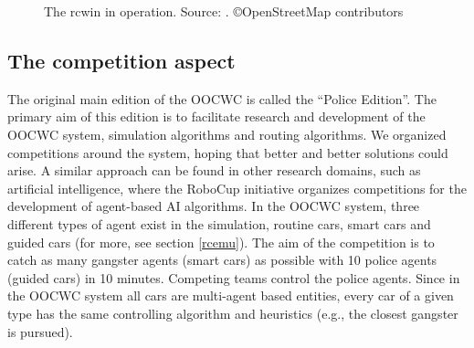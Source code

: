 \documentclass[b5paper,12pt]{report}
\theoremstyle{definition}
\begin{document}
\begin{figure}[!ht]
\begin{center}
\end{center}
\caption{The rcwin in operation. Source: \cite{infocomjournal}. \copyright OpenStreetMap contributors}
\label{rcwin_example}
\end{figure} 

\subsection{The competition aspect}
\label{competition}

The original main edition of the OOCWC is called the \enquote{Police Edition}. The primary aim of this edition is to facilitate research and development of the OOCWC system, simulation algorithms and routing algorithms. We organized competitions around the system, hoping that better and better solutions could arise. A similar approach can be found in other research domains, such as artificial intelligence, where the RoboCup initiative \cite{kitano1997robocup} organizes competitions for the development of agent-based AI algorithms. In the OOCWC system, three different types of agent exist in the simulation, routine cars, smart cars and guided cars (for more, see section \ref{rcemu}). The aim of the competition is to catch as many gangster agents (smart cars) as possible with 10 police agents (guided cars) in 10 minutes. Competing teams control the police agents. Since in the OOCWC system all cars are multi-agent based entities, every car of a given type has the same controlling algorithm and heuristics (e.g., the closest gangster is pursued).
\end{document}
